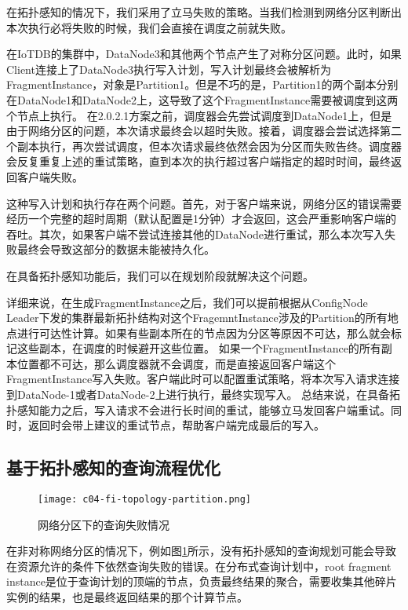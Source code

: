 在拓扑感知的情况下，我们采用了立马失败的策略。当我们检测到网络分区判断出本次执行必将失败的时候，我们会直接在调度之前就失败。


在IoTDB的集群中，DataNode3和其他两个节点产生了对称分区问题。此时，如果Client连接上了DataNode3执行写入计划，写入计划最终会被解析为FragmentInstance，对象是Partition1。但是不巧的是，Partition1的两个副本分别在DataNode1和DataNode2上，这导致了这个FragmentInstance需要被调度到这两个节点上执行。
在2.0.2.1方案之前，调度器会先尝试调度到DataNode1上，但是由于网络分区的问题，本次请求最终会以超时失败。接着，调度器会尝试选择第二个副本执行，再次尝试调度，但本次请求最终依然会因为分区而失败告终。调度器会反复重复上述的重试策略，直到本次的执行超过客户端指定的超时时间，最终返回客户端失败。

这种写入计划和执行存在两个问题。首先，对于客户端来说，网络分区的错误需要经历一个完整的超时周期（默认配置是1分钟）才会返回，这会严重影响客户端的吞吐。其次，如果客户端不尝试连接其他的DataNode进行重试，那么本次写入失败最终会导致这部分的数据未能被持久化。


在具备拓扑感知功能后，我们可以在规划阶段就解决这个问题。

详细来说，在生成FragmentInstance之后，我们可以提前根据从ConfigNode Leader下发的集群最新拓扑结构对这个FragemntInstance涉及的Partition的所有地点进行可达性计算。如果有些副本所在的节点因为分区等原因不可达，那么就会标记这些副本，在调度的时候避开这些位置。
如果一个FragmentInstance的所有副本位置都不可达，那么调度器就不会调度，而是直接返回客户端这个FragmentInstance写入失败。客户端此时可以配置重试策略，将本次写入请求连接到DataNode-1或者DataNode-2上进行执行，最终实现写入。
总结来说，在具备拓扑感知能力之后，写入请求不会进行长时间的重试，能够立马发回客户端重试。同时，返回时会带上建议的重试节点，帮助客户端完成最后的写入。

\subsection{基于拓扑感知的查询流程优化}\label{sec:topology-query-plan}

\begin{figure}
  \centering
  \texttt{[image: c04-fi-topology-partition.png]}
  \caption{网络分区下的查询失败情况}
  \label{fig:fi-topology-partition}
\end{figure}

在非对称网络分区的情况下，例如图\ref{fig:fi-topology-partition}所示，没有拓扑感知的查询规划可能会导致在资源允许的条件下依然查询失败的错误。在分布式查询计划中，root fragment instance是位于查询计划的顶端的节点，负责最终结果的聚合，需要收集其他碎片实例的结果，也是最终返回结果的那个计算节点。

